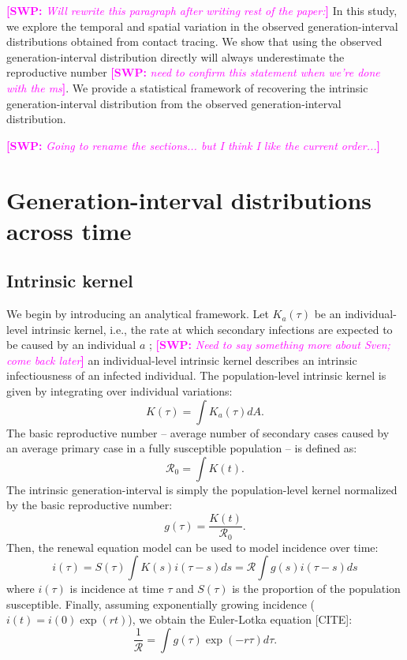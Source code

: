 \documentclass[12pt]{article}
\newcommand{\RR}{\ensuremath{{\mathcal R}}}
\newcommand{\comment}[3]{\textcolor{#1}{\textbf{[#2: }\textsl{#3}\textbf{]}}}
\newcommand{\swp}[1]{\comment{magenta}{SWP}{#1}}
\begin{document}
\swp{Will rewrite this paragraph after writing rest of the paper:}
In this study, we explore the temporal and spatial variation in the observed generation-interval distributions obtained from contact tracing.
We show that using the observed generation-interval distribution directly will always underestimate the reproductive number \swp{need to confirm this statement when we're done with the ms}. 
We provide a statistical framework of recovering the intrinsic generation-interval distribution from the observed generation-interval distribution.

\swp{Going to rename the sections... but I think I like the current order...}
\section{Generation-interval distributions across time}

\subsection{Intrinsic kernel}

We begin by introducing an analytical framework.
Let $K_a(\tau)$ be an individual-level intrinsic kernel, i.e., the rate at which secondary infections are expected to be caused by an individual $a$ \citep{svensson2015influence}; \swp{Need to say something more about Sven; come back later}
an individual-level intrinsic kernel describes an intrinsic infectiousness of an infected individual.
The population-level intrinsic kernel is given by integrating over individual variations:
\begin{equation}
K(\tau) = \int K_a (\tau) dA.
\end{equation}
The basic reproductive number -- average number of secondary cases caused by an average primary case in a fully susceptible population -- is defined as: 
\begin{equation}
\RR_0 = \int K(t).
\end{equation}
The intrinsic generation-interval is simply the population-level kernel normalized by the basic reproductive number:
\begin{equation}
g(\tau) = \frac{K(t)}{\RR_0}.
\end{equation}
Then, the renewal equation model can be used to model incidence over time:
\begin{equation}
i(\tau) = S(\tau) \int K(s) i(\tau-s) ds = \RR \int g(s) i(\tau-s) ds
\end{equation}
where $i(\tau)$ is incidence at time $\tau$ and $S(\tau)$ is the proportion of the population susceptible.
Finally, assuming exponentially growing incidence ($i(t) = i(0) \exp(r t)$), we obtain the Euler-Lotka equation [CITE]:
\begin{equation}
\frac{1}{\RR} = \int g(\tau) \exp(-r \tau) d\tau.
\end{equation}
\end{document}

